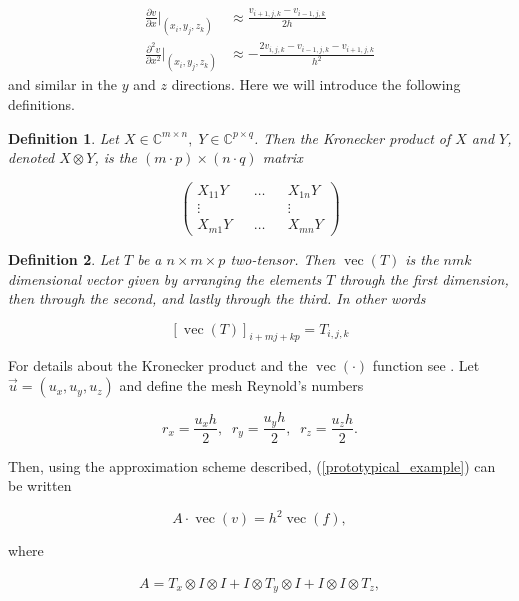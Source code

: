 \documentclass{article}
\DeclareMathOperator{\vect}{vec}
\newcommand{\bC}{\mathds{C}}
\newtheorem{definition}{Definition}[section]
\begin{document}
\begin{align}
    \frac{\partial v}{\partial x}|_{(x_i, y_j, z_k)} &\approx \frac{v_{i+1,j,k} - v_{i-1,j,k}}{2h} \\
    \frac{\partial^2 v}{\partial x^2}|_{(x_i, y_j, z_k)} &\approx -\frac{2v_{i,j,k} - v_{i-1,j,k}-v_{i+1,j,k}}{h^2}
\end{align}
and similar in the $y$ and $z$ directions. Here we will introduce the following definitions.

\begin{definition} Let $X \in \bC^{m \times n}, \;  Y \in \bC^{p \times q}$. Then the Kronecker product of $X$ and $Y$, denoted $ X \otimes Y$, is the $(m \cdot p) \times(n \cdot q)$ matrix

    $$\begin{pmatrix}X_{11}Y && \ldots && X_{1n}Y \\
                    \vdots && &&\vdots \\
                    X_{m1}Y && \ldots && X_{mn}Y
                    \end{pmatrix} $$
\end{definition}

\begin{definition} Let $T$ be a $n \times m \times p$  two-tensor. Then $\vect(T)$ is the $nmk$ dimensional vector given by arranging  the elements $T$ through the first dimension, then through the second, and lastly through the third. In other words

    $$[\vect(T)]_{i + mj + kp}  = T_{i,j,k}$$
\end{definition}

For details about the Kronecker product and the $\vect(\cdot)$ function see \cite[][pp 274-276]{AppliedNumerical}. Let $\vec{u} = (u_x, u_y,u_z )$ and define the mesh Reynold's numbers

\begin{equation}
    r_x = \frac{u_x h}{2}, \; \; r_y = \frac{u_y h}{2}, \; \;  r_z = \frac{u_z h}{2}.
\end{equation}

Then, using the approximation scheme described, (\ref{prototypical_example}) can be written \cite{greif1999block, AppliedNumerical}

\begin{equation}
    A \cdot \vect(v) = h^2\vect(f),
\end{equation}

where

\begin{align}
    A = T_x \otimes I \otimes I + I \otimes T_y \otimes I + I \otimes I \otimes T_z,
\end{align}
\end{document}

